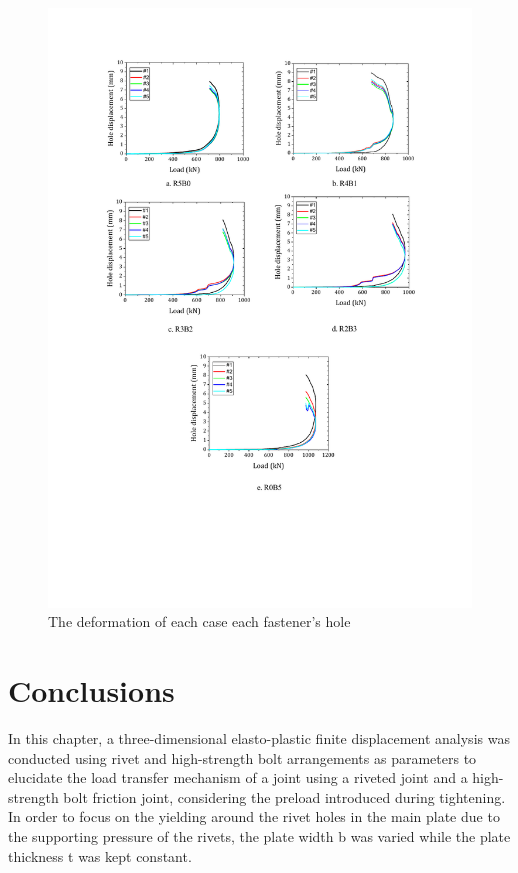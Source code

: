 \begin{figure}
    \centering
    \includegraphics[width=1\linewidth]{imgs//ch4/fig-5rholedef.pdf}
    \caption{The deformation of each case each fastener's hole}
    \label{fig-5rholedef}
\end{figure}

\section{Conclusions}

In this chapter, a three-dimensional elasto-plastic finite displacement analysis was conducted using rivet and high-strength bolt arrangements as parameters to elucidate the load transfer mechanism of a joint using a riveted joint and a high-strength bolt friction joint, considering the preload introduced during tightening. In order to focus on the yielding around the rivet holes in the main plate due to the supporting pressure of the rivets, the plate width b was varied while the plate thickness t was kept constant.

